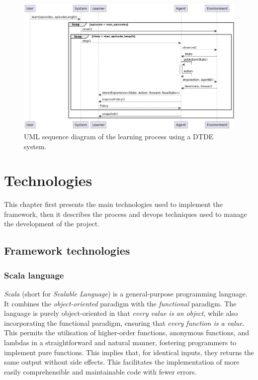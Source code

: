 \documentclass[12pt,a4paper,openright,twoside]{book}
\begin{document}
\begin{figure}[t]
    \centering
    \includegraphics[width=\textwidth]{figures/DTDE-System-Sequence-Diagram.png}
    \caption{UML sequence diagram of the learning process using a DTDE system.}
    \label{fig:dtde-sequence}
\end{figure}

\chapter{Technologies} 
\label{chap:project}

This chapter first presents the main technologies used to implement the framework, then it describes 
    the process and devops techniques used to manage the development of the project.

\section{Framework technologies}
\subsection*{Scala language}

\emph{Scala} (short for \emph{Scalable Language}) is a general-purpose programming language. 
    It combines the \emph{object-oriented} paradigm with the \emph{functional} paradigm. The language is purely object-oriented 
    in that \emph{every value is an object}, while also incorporating the functional paradigm, ensuring 
    that \emph{every function is a value}. This permits the utilisation of higher-order functions, anonymous functions, and 
    lambdas in a straightforward and natural manner, fostering programmers to implement pure functions. This implies that, 
    for identical inputs, they returns the same output without side effects. This facilitates the implementation of more easily 
    comprehensible and maintainable code with fewer errors.
\end{document}
